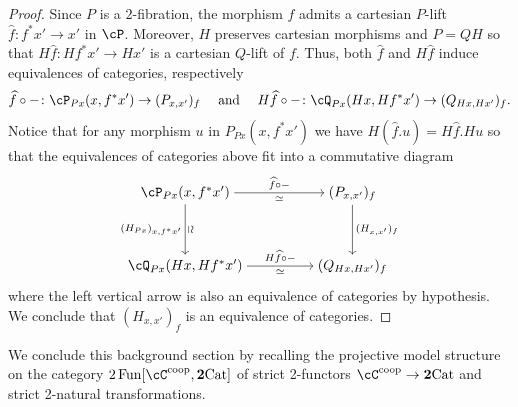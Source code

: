 \documentclass[11pt, dvipsnames]{amsart}
\begin{document}
\begin{proof}
Since $P$ is a $2$-fibration, the morphism $f$ admits a cartesian $P$-lift $\widehat{f}\colon f^{\ast}x' \to x'$ in $\cP$. Moreover, $H$ preserves cartesian morphisms and $P=QH$ so that $H\widehat{f}\colon Hf^{\ast}x'\to Hx'$ is a cartesian $Q$-lift of $f$. Thus, both $\widehat{f}$ and $H\widehat{f}$ induce equivalences of categories, respectively
\[
    \widehat{f} \circ - \colon \cP_{Px}(x, f^{\ast}x') \to (P_{x,x'})_f \quad\text{ and }\quad
    H\widehat{f} \circ - \colon \cQ_{Px}(Hx,Hf^{\ast}x') \to (Q_{Hx,Hx'})_f.
\]
Notice that for any morphism $u$ in $P_{Px}(x, f^{\ast}x')$ we have $H(\widehat{f}.u) = H\widehat{f}. Hu$ so that the equivalences of categories above fit into a commutative diagram 
\[\begin{tikzcd}[cramped]
	{\cP_{Px}(x, f^{\ast}x')} && {(P_{x,x'})_f} \\
	\\
	{\cQ_{Px}(Hx,Hf^{\ast}x')} && {(Q_{Hx,Hx'})_f}
	\arrow["{\widehat{f}\circ -}","\simeq"', from=1-1, to=1-3]
	\arrow["{(H_{Px})_{x,f^{\ast}x'}}"',"\mathrel{\rotatebox[origin=c]{-90}{$\simeq$}}", from=1-1, to=3-1]
	\arrow["{(H_{x,x'})_f}", from=1-3, to=3-3]
	\arrow["{H\widehat{f}\circ - }","\simeq"', from=3-1, to=3-3]
\end{tikzcd}\]
where the left vertical arrow is also an equivalence of categories by hypothesis. We conclude that $(H_{x,x'})_f$ is an equivalence of categories.
\end{proof}



	We conclude this background section by recalling the projective model structure on the category $2\Fun[\cC^{\coop}, \ttwocat]$ of strict 2-functors $\cC^{\coop}\to\ttwocat$ and strict 2-natural transformations.
\end{document}
